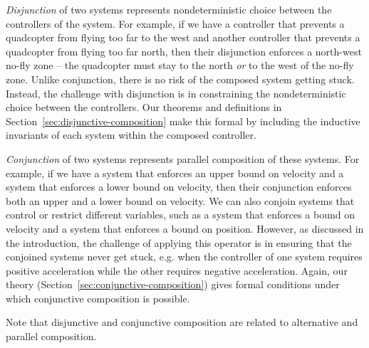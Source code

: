 \emph{Disjunction} of two systems represents nondeterministic choice
between the controllers of the system.  For example, if we have a
controller that prevents a quadcopter from flying too far to the west and
another controller that prevents a quadcopter from flying too far north,
then their disjunction enforces a north-west no-fly zone -- the quadcopter
must stay to the north \emph{or} to the west of the no-fly zone.  Unlike
conjunction, there is no risk of the composed system getting stuck.
Instead, the challenge with disjunction is in constraining the
nondeterministic choice between the controllers.  Our theorems and
definitions in Section~\ref{sec:disjunctive-composition} make this formal
by including the inductive invariants of each system within the composed
controller.

\emph{Conjunction} of two systems represents parallel composition of these
systems.  For example, if we have a system that enforces an upper bound on
velocity and a system that enforces a lower bound on velocity, then their
conjunction enforces both an upper and a lower bound on velocity.  We can
also conjoin systems that control or restrict different variables, such as
a system that enforces a bound on velocity and a system that enforces a
bound on position.  However, as discussed in the introduction, the
challenge of applying this operator is in ensuring that the conjoined
systems never get stuck, e.g. when the controller of one system requires
positive acceleration while the other requires negative acceleration.
Again, our theory (Section~\ref{sec:conjunctive-composition}) gives formal
conditions under which conjunctive composition is possible.

Note that disjunctive and conjunctive composition are related to
alternative and parallel composition.

